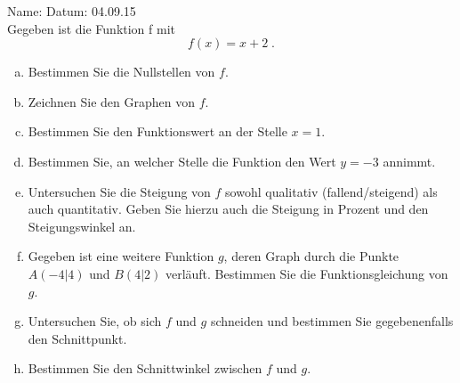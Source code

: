 \documentclass[12pt,fleqn]{article}
\theoremstyle{aufg}
\theoremstyle{bsp}
\begin{document}
 
    \begin{flushleft}
Name: \hspace{12cm} Datum: 04.09.15 \\[2em]Gegeben ist die Funktion f mit\[f(x)=x + 2\; . \]\begin{enumerate}[a)] 
\item 
Bestimmen Sie die Nullstellen von $f$. \\ 

\item 
Zeichnen Sie den Graphen von $f$. \\ 

\item 
Bestimmen Sie den Funktionswert an der Stelle $x=1$. \\ 

\item 
Bestimmen Sie, an welcher Stelle die Funktion den Wert $y=-3$ annimmt. \\ 

\item 
Untersuchen Sie die Steigung von $f$ sowohl qualitativ (fallend/steigend) als auch quantitativ. Geben Sie hierzu auch die Steigung in Prozent und den Steigungswinkel an. \\ 

\item 
Gegeben ist eine weitere Funktion $g$, deren Graph durch die Punkte $A(-4|4)$ und $B(4|2)$ verl\"auft. Bestimmen Sie die Funktionsgleichung von $g$. \\ 

\item 
Untersuchen Sie, ob sich $f$ und $g$ schneiden und bestimmen Sie gegebenenfalls den Schnittpunkt. \\ 

\item 
Bestimmen Sie den Schnittwinkel zwischen $f$ und $g$. \\ 

\end{enumerate} 
\end{flushleft} 
    
\end{document}
